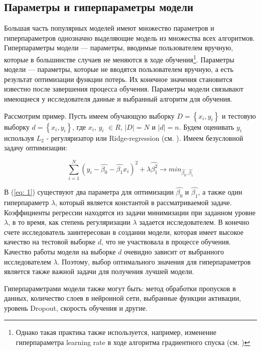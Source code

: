 \documentclass[a4paper, 14pt]{article}
\begin{document}
\subsection{Параметры и гиперпараметры модели}
Большая часть популярных моделей имеют множество параметров и гиперпараметров однозначно выделяющие модель из множества всех алгоритмов. Гиперпараметры модели --- параметры, вводимые пользователем вручную, которые в большинстве случаев не меняются в ходе обучения\footnote{Однако такая практика также используется, например, изменение гиперпараметра  learning rate в ходе алгоритма градиентного спуска (см. \cite{zeiler2012adadelta})}. Параметры модели --- параметры, которые не вводятся пользователем вручную, а есть результат оптимизации функции потерь. Их конечное значения становится известно после завершения процесса обучения. Параметры модели связывают имеющиеся у исследователя данные и выбранный алгоритм для обучения. 

Рассмотрим пример. Пусть имеем обучающую выборку $D = \left\{x_i, y_i\right\}$ и тестовую выборку $d = \left\{x_i, y_i\right\}$, где $x_i$, $y_i$ $\in R$, $\left|D\right| = N$ и $\left|d\right| = n$. Будем оценивать $y_i$ используя $L_2$ - регуляризатор или Ridge-regression (см. \cite{hoerl1970ridge}). Имеем безусловной задачу оптимизации:


\begin{equation} 
\label{ridge} %
\sum_{i=1}^{N} (y_i - \hat{\beta_0} - \hat{\beta_1} x_i)^2 + \lambda \hat{\beta_1^2} \rightarrow min_{\hat{\beta_0}, \hat{\beta_1}}
\end{equation} 

В (\ref{eq: 1}) существуют два параметра для оптимизации $\hat{\beta_0} \text{ и } \hat{\beta_1}$, а также один гиперпараметр $\lambda$, который является константой в рассматриваемой задаче. Коэффициенты регрессии находятся из задачи минимизации при заданном уровне $\lambda$, в то время, как степень регуляризации $\lambda$ задается исследователем. В конечно счете исследователь заинтересован в создании модели, которая имеет высокое качество на тестовой выборке $d$, что не участвовала в процессе обучения. Качество работы модели на выборке $d$ очевидно зависит от выбранного исследователем $\lambda$. Поэтому, выбор оптимального значения для гиперпараметров является также важной задачи для получения лучшей модели.

Гиперпараметрами модели также могут быть: метод обработки пропусков в данных, количество слоев в нейронной сети, выбранные функции активации, уровень Dropout, скорость обучения и другие. 
\end{document}
